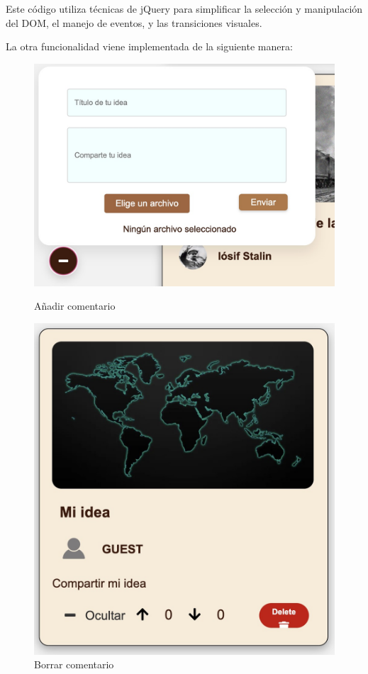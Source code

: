 \documentclass{article}
\begin{document}
Este código utiliza técnicas de jQuery para simplificar la selección y manipulación del DOM, el manejo de eventos, y las transiciones visuales.

La otra funcionalidad viene implementada de la siguiente manera:

\begin{figure}[H]
    \centering
    \begin{minipage}{0.49\textwidth}
        \includegraphics[width=\linewidth]{jsFotos/anadirComentario.jpg}
        \caption{Añadir comentario}
        \label{fig:foro_interface}
    \end{minipage}\hfill
    \begin{minipage}{0.49\textwidth}
        \includegraphics[width=\linewidth]{jsFotos/miComentario.jpg}
        \caption{Borrar comentario}
        \label{fig:prototipo_foro}
    \end{minipage}
\end{figure}
\end{document}
